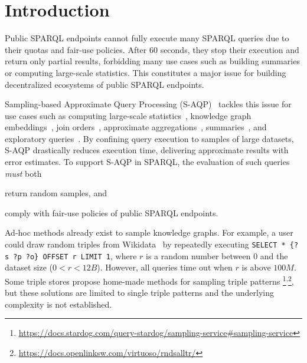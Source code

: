 
\section{Introduction}

Public SPARQL endpoints cannot fully execute many SPARQL queries due
to their quotas and fair-use policies. After 60 seconds, they stop
their execution and return only partial results, forbidding many use
cases such as building summaries or computing large-scale statistics.
This constitutes a major issue for building decentralized ecosystems
of public SPARQL endpoints.

Sampling-based Approximate Query Processing
(S-AQP)~\cite{DBLP:conf/sigmod/AgarwalMKTJMMS14} tackles this issue
for use cases such as computing large-scale
statistics~\cite{soulet2019anytime,10.1007/978-3-319-18818-8_14},
knowledge graph embeddings~\cite{ristoski2016rdf2vec}, join
orders~\cite{DBLP:conf/cidr/LeisRGK017}, approximate
aggregations~\cite{wang2022approximate},
summaries~\cite{10.1007/978-3-030-49461-2_10}, and exploratory
queries~\cite{DBLP:conf/sigmod/AgarwalMKTJMMS14}.  By confining query
execution to samples of large datasets, S-AQP drastically reduces
execution time, delivering approximate results with error estimates.
%
To support S-AQP in SPARQL, the evaluation of such queries \emph{must}
both
\begin{inparaenum}[(i)]
\item return random samples, and
\item comply with fair-use policies of public SPARQL endpoints.
\end{inparaenum}
Ad-hoc methods already exist to sample knowledge graphs.  For example, a user could draw random triples from
Wikidata~\cite{soulet2019anytime} by repeatedly executing
\verb|SELECT * {?s ?p ?o} OFFSET r LIMIT 1|, where $r$ is a random
number between $0$ and the dataset size ($0<r<12B$). However, all
queries time out when $r$ is above $100M$.
Some triple stores propose home-made methods for sampling triple
patterns%
\footnote{\url{https://docs.stardog.com/query-stardog/sampling-service\#sampling-service}}\textsuperscript{,}\footnote{\url{https://docs.openlinksw.com/virtuoso/rndsalltr/}},
but these solutions are limited to single triple patterns and the
underlying complexity is not established.

